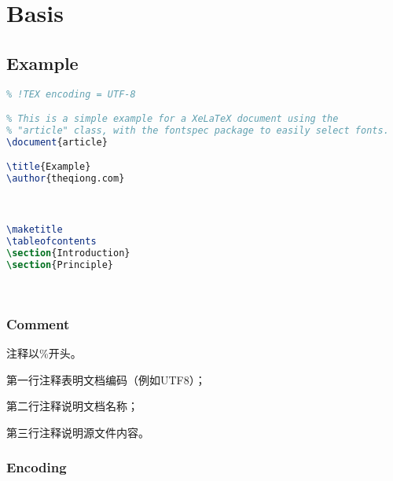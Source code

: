 \part{Basis}



\chapter{Example}



\begin{lstlisting}[language=TeX]
% !TEX TS-program = xelatex
% !TEX encoding = UTF-8

% This is a simple example for a XeLaTeX document using the
% "article" class, with the fontspec package to easily select fonts.
\document{article}

\title{Example}
\author{theqiong.com}



\maketitle
\tableofcontents
\section{Introduction}
\section{Principle}




\end{lstlisting}



\section{Comment}


注释以\%开头。

\begin{compactitem}
\item 第一行注释表明文档编码（例如UTF8）；
\item 第二行注释说明文档名称；
\item 第三行注释说明源文件内容。
\end{compactitem}


\section{Encoding}

